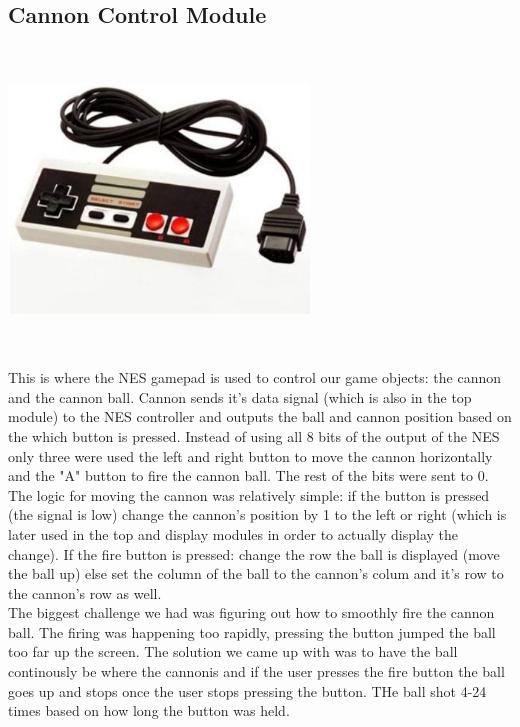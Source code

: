 \documentclass[12pt]{article}
\begin{document}
\begin{flushleft}
\subsection{Cannon Control Module}
\begin{center}
\includegraphics[width=8cm, height=8cm]{nes}
\end{center}
This is where the NES gamepad is used to control our game objects: the cannon
and the cannon ball. Cannon sends it's data signal (which is also in the top
module) to the NES controller and outputs the ball and cannon position based on
the which button is pressed. Instead of using all 8 bits of the output of the
NES only three were used the left and right button to move the cannon
horizontally and the "A" button to fire the cannon ball. The rest of the bits
were sent to 0. \\
\hfill \break
The logic for moving the cannon was relatively simple: if the button is pressed
(the signal is low) change the cannon's position by 1 to the left or right (which is later used in the top
and display modules in order to actually display the change). If the fire button
is pressed: change the row the ball is displayed (move the ball up) else set the
column of the ball to the cannon's colum and it's row to the cannon's row as
well. \\

\hfill \break
The biggest challenge we had was figuring out how to smoothly fire the cannon
ball. The firing was happening too rapidly, pressing the button jumped the ball
too far up the screen. The solution we came up with was to have the ball
continously be where the cannonis and if the user presses the fire button the
ball goes up and stops once the user stops pressing the button. THe ball shot
4-24 times based on how long the button was held. 

\end{flushleft}
\end{document}
